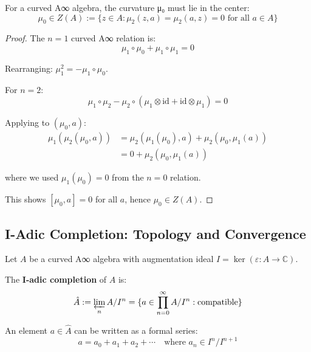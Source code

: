 \begin{theorem}
\label{thm:curvature-central}
For a curved A∞ algebra, the curvature μ₀ must lie in the center:
\begin{equation}
\mu_0 \in Z(A) := \{z \in A : \mu_2(z, a) = \mu_2(a, z) = 0 \text{ for all } a \in A\}
\end{equation}
\end{theorem}

\begin{proof}
The $n=1$ curved A∞ relation is:
\begin{equation}
\mu_1 \circ \mu_0 + \mu_1 \circ \mu_1 = 0
\end{equation}

Rearranging: $\mu_1^2 = -\mu_1 \circ \mu_0$.

For $n=2$:
\begin{equation}
\mu_1 \circ \mu_2 - \mu_2 \circ (\mu_1 \otimes \text{id} + \text{id} \otimes \mu_1) = 0
\end{equation}

Applying to $(\mu_0, a)$:
\begin{align}
\mu_1(\mu_2(\mu_0, a)) &= \mu_2(\mu_1(\mu_0), a) + \mu_2(\mu_0, \mu_1(a))\\
&= 0 + \mu_2(\mu_0, \mu_1(a))
\end{align}

where we used $\mu_1(\mu_0) = 0$ from the $n=0$ relation.

This shows $[\mu_0, a] = 0$ for all $a$, hence $\mu_0 \in Z(A)$.
\end{proof}

\subsection{I-Adic Completion: Topology and Convergence}
\label{sec:i-adic-completion}

\begin{definition}
\label{def:i-adic-topology}
Let $A$ be a curved A∞ algebra with augmentation ideal $I = \ker(\varepsilon: A \to \mathbb{C})$.

The \textbf{I-adic completion} of $A$ is:
\begin{equation}
\hat{A} := \varprojlim_n A/I^n = \{a \in \prod_{n=0}^\infty A/I^n : 
\text{compatible}\}
\end{equation}

An element $a \in \hat{A}$ can be written as a formal series:
\begin{equation}
a = a_0 + a_1 + a_2 + \cdots \quad \text{where } a_n \in I^n/I^{n+1}
\end{equation}
\end{definition}

